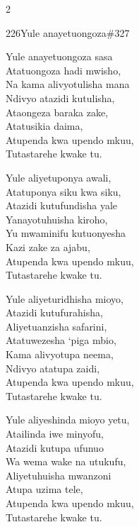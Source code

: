 \documentclass{article}
\begin{document}
\begin{multicols}{2}
\begin{hymn}{226}{Yule anayetuongoza}{\#327}
\begin{stanza}
Yule anayetuongoza sasa\\
Atatuongoza hadi mwisho,\\
Na kama alivyotulisha mana\\
Ndivyo atazidi kutulisha,\\
Ataongeza baraka zake,\\
Atatusikia daima,\\
Atupenda kwa upendo mkuu,\\
Tutastarehe kwake tu.
\end{stanza}
\begin{stanza}
Yule aliyetuponya awali,\\
Atatuponya siku kwa siku,\\
Atazidi kutufundisha yale\\
Yanayotuhuisha kiroho,\\
Yu mwaminifu kutuonyesha\\
Kazi zake za ajabu,\\
Atupenda kwa upendo mkuu,\\
Tutastarehe kwake tu.
\end{stanza}
\begin{stanza}
Yule aliyeturidhisha mioyo,\\
Atazidi kutufurahisha,\\
Aliyetuanzisha safarini,\\
Atatuwezesha `piga mbio,\\
Kama alivyotupa neema,\\
Ndivyo atatupa zaidi,\\
Atupenda kwa upendo mkuu,\\
Tutastarehe kwake tu.
\end{stanza}
\begin{stanza}
Yule aliyeshinda mioyo yetu,\\
Atailinda iwe minyofu,\\
Atazidi kutupa ufunuo\\
Wa wema wake na utukufu,\\
Aliyetuhuisha mwanzoni\\
Atupa uzima tele,\\
Atupenda kwa upendo mkuu,\\
Tutastarehe kwake tu.
\end{stanza}
\end{hymn}


\end{multicols}
\end{document}
